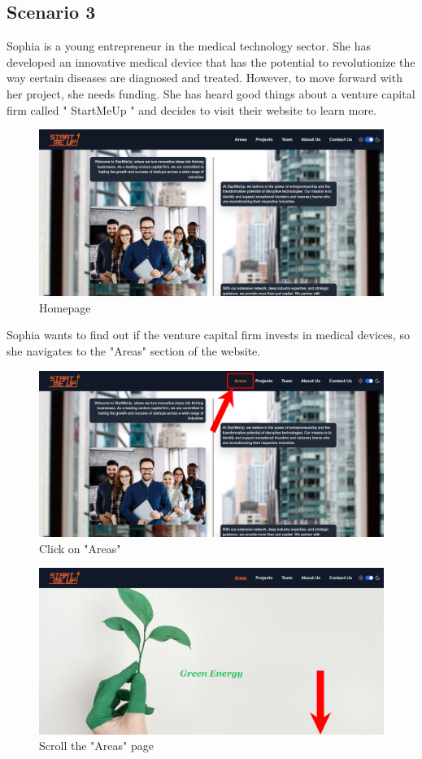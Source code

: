 \documentclass[11pt, letterpaper]{article}
\begin{document}
\subsection{Scenario 3}
Sophia is a young entrepreneur in the medical technology sector. She has developed an innovative medical device that has the potential to revolutionize the way certain diseases are diagnosed and treated. However, to move forward with her project, she needs funding. She has heard good things about a venture capital firm called " StartMeUp " and decides to visit their website to learn more.
\begin{figure}[H]
    \centering
    \includegraphics[width=16cm]{images/Scenarios/Scenario3/Screen1.png}
    \caption{Homepage}
    \label{fig:scenario3_1}
\end{figure}
\noindent
Sophia wants to find out if the venture capital firm invests in medical devices, so she navigates to the "Areas" section of the website.
\begin{figure}[H]
    \centering
    \includegraphics[width=16cm]{images/Scenarios/Scenario3/Screen2.png}
    \caption{Click on "Areas"}
    \label{fig:scenario3_2}
\end{figure}
\begin{figure}[H]
    \centering
    \includegraphics[width=16cm]{images/Scenarios/Scenario3/Screen3.png}
    \caption{Scroll the "Areas" page}
    \label{fig:scenario3_3}
\end{figure}
\end{document}

